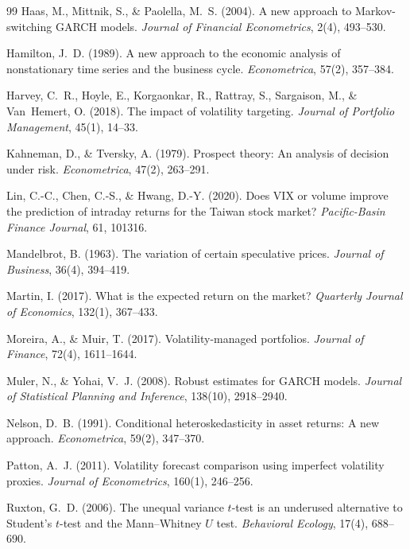 \documentclass[12pt,a4paper]{article}
\begin{document}
\begin{thebibliography}{99}
Haas, M., Mittnik, S., \& Paolella, M.~S. (2004). A new approach to Markov-switching GARCH models. \textit{Journal of Financial Econometrics}, 2(4), 493--530.

Hamilton, J.~D. (1989). A new approach to the economic analysis of nonstationary time series and the business cycle. \textit{Econometrica}, 57(2), 357--384.

Harvey, C.~R., Hoyle, E., Korgaonkar, R., Rattray, S., Sargaison, M., \& Van~Hemert, O. (2018). The impact of volatility targeting. \textit{Journal of Portfolio Management}, 45(1), 14--33.

Kahneman, D., \& Tversky, A. (1979). Prospect theory: An analysis of decision under risk. \textit{Econometrica}, 47(2), 263--291.

Lin, C.-C., Chen, C.-S., \& Hwang, D.-Y. (2020). Does VIX or volume improve the prediction of intraday returns for the Taiwan stock market? \textit{Pacific-Basin Finance Journal}, 61, 101316.

Mandelbrot, B. (1963). The variation of certain speculative prices. \textit{Journal of Business}, 36(4), 394--419.

Martin, I. (2017). What is the expected return on the market? \textit{Quarterly Journal of Economics}, 132(1), 367--433.

Moreira, A., \& Muir, T. (2017). Volatility-managed portfolios. \textit{Journal of Finance}, 72(4), 1611--1644.

Muler, N., \& Yohai, V.~J. (2008). Robust estimates for GARCH models. \textit{Journal of Statistical Planning and Inference}, 138(10), 2918--2940.

Nelson, D.~B. (1991). Conditional heteroskedasticity in asset returns: A new approach. \textit{Econometrica}, 59(2), 347--370.

Patton, A.~J. (2011). Volatility forecast comparison using imperfect volatility proxies. \textit{Journal of Econometrics}, 160(1), 246--256.

Ruxton, G.~D. (2006). The unequal variance $t$-test is an underused alternative to Student's $t$-test and the Mann--Whitney $U$ test. \textit{Behavioral Ecology}, 17(4), 688--690.


\end{thebibliography}
\end{document}
